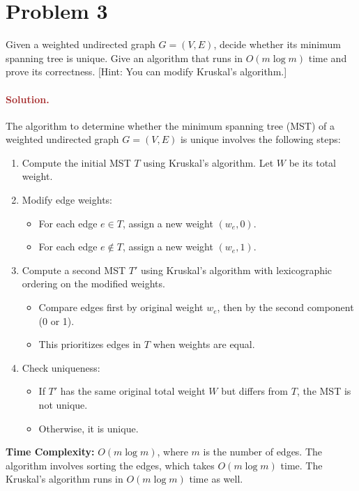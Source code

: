 \section*{Problem 3}
Given a weighted undirected graph $G = (V, E)$, decide whether its minimum spanning tree is unique. Give an algorithm that runs in $O(m \log m)$ time and prove its correctness. [Hint: You can modify Kruskal's algorithm.]


\paragraph{\textcolor{brown}{Solution.}}
The algorithm to determine whether the minimum spanning tree (MST) of a weighted undirected graph \( G = (V, E) \) is unique involves the following steps:
\begin{enumerate}
    \item Compute the initial MST \( T \) using Kruskal's algorithm. Let \( W \) be its total weight.
    \item Modify edge weights:
    \begin{itemize}
        \item For each edge \( e \in T \), assign a new weight \( (w_e, 0) \).
        \item For each edge \( e \notin T \), assign a new weight \( (w_e, 1) \).
    \end{itemize}
    \item Compute a second MST \( T' \) using Kruskal's algorithm with lexicographic ordering on the modified weights.
    \begin{itemize}
        \item Compare edges first by original weight \( w_e \), then by the second component (0 or 1).
        \item This prioritizes edges in \( T \) when weights are equal.
    \end{itemize}
    \item Check uniqueness:
    \begin{itemize}
        \item If \( T' \) has the same original total weight \( W \) but differs from \( T \), the MST is not unique.
        \item Otherwise, it is unique.
    \end{itemize}
\end{enumerate}

\textbf{Time Complexity:} \( O(m \log m) \), where \( m \) is the number of edges. The algorithm involves sorting the edges, which takes \( O(m \log m) \) time. The Kruskal's algorithm runs in \( O(m \log m) \) time as well.\\


